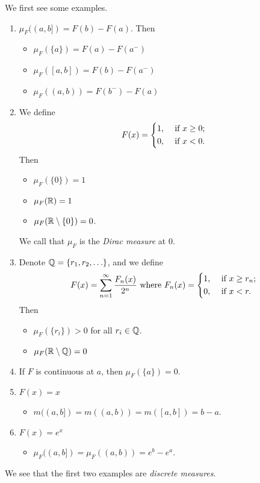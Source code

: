 \begin{eg}
	We first see some examples.
	\begin{enumerate}
		\item \(\mu _F((a, b]) = F(b) - F(a)\). Then
		      \begin{itemize}
			      \item \(\mu _F(\{a\}) = F(a) - F(a^-)\)
			      \item \(\mu _F([a, b]) = F(b) - F(a^-)\)
			      \item \(\mu _F((a, b)) = F(b^-) - F(a)\)
		      \end{itemize}
		\item We define
		      \[
			      F(x) = \begin{dcases}
				      1, & \text{ if } x\geq 0 ; \\
				      0, & \text{ if } x<0.
			      \end{dcases}
		      \]
		      Then
		      \begin{itemize}
			      \item \(\mu _F(\{0\})=1\)
			      \item \(\mu _F(\mathbb{\MakeUppercase{r}} ) = 1\)
			      \item \(\mu _F(\mathbb{\MakeUppercase{r}}\setminus \{0\} ) = 0\).
		      \end{itemize}
		      We call that \(\mu _F\) is the \emph{Dirac measure} at \(0\).
		\item Denote \(\mathbb{\MakeUppercase{q}} = \{r_1, r_2, \ldots  \}\), and we define
		      \[
			      F(x) = \sum\limits_{n=1}^{\infty} \frac{F_n(x)}{2^n} \text{ where }  F_{n}(x) = \begin{dcases}
				      1, & \text{ if } x\geq r_n; \\
				      0, & \text{ if } x<r.       \\
			      \end{dcases}
		      \]
		      Then
		      \begin{itemize}
			      \item \(\mu _F(\{r_{i}\})>0\) for all \(r_{i}\in\mathbb{\MakeUppercase{q}} \).
			      \item \(\mu _F(\mathbb{\MakeUppercase{r}} \setminus \mathbb{\MakeUppercase{q}} ) = 0\)
		      \end{itemize}
		\item If \(F\) is continuous at \(a\), then \(\mu _F(\{a\}) = 0\).
		\item \(F(x) = x\)
		      \begin{itemize}
			      \item \( m((a, b]) = m((a, b)) = m([a, b]) = b - a\).
		      \end{itemize}
		\item \(F(x) = e^x\)
		      \begin{itemize}
			      \item \(\mu _F((a, b]) = \mu _F((a, b)) = e^b - e^a\).
		      \end{itemize}
	\end{enumerate}
	\begin{remark}
		We see that the first two examples are \emph{discrete measures}.
	\end{remark}
\end{eg}

